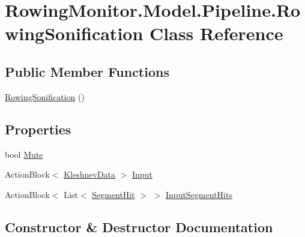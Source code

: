 \hypertarget{class_rowing_monitor_1_1_model_1_1_pipeline_1_1_rowing_sonification}{}\section{Rowing\+Monitor.\+Model.\+Pipeline.\+Rowing\+Sonification Class Reference}
\label{class_rowing_monitor_1_1_model_1_1_pipeline_1_1_rowing_sonification}
\subsection*{Public Member Functions}
\begin{DoxyCompactItemize}
\item 
\hyperlink{class_rowing_monitor_1_1_model_1_1_pipeline_1_1_rowing_sonification_aa3189ffe2f7c36a9cc5afaad8c7d896d}{Rowing\+Sonification} ()
\end{DoxyCompactItemize}
\subsection*{Properties}
\begin{DoxyCompactItemize}
\item 
bool \hyperlink{class_rowing_monitor_1_1_model_1_1_pipeline_1_1_rowing_sonification_af076633c8ac6e8f30336b0ca0bb891e0}{Mute}
\item 
Action\+Block$<$ \hyperlink{struct_rowing_monitor_1_1_model_1_1_pipeline_1_1_kleshnev_data}{Kleshnev\+Data} $>$ \hyperlink{class_rowing_monitor_1_1_model_1_1_pipeline_1_1_rowing_sonification_aa36c7f6801b612cb4363e2c0338e6e70}{Input}
\item 
Action\+Block$<$ List$<$ \hyperlink{struct_rowing_monitor_1_1_model_1_1_util_1_1_segment_hit}{Segment\+Hit} $>$ $>$ \hyperlink{class_rowing_monitor_1_1_model_1_1_pipeline_1_1_rowing_sonification_a52fbdd66e6e0d5a8a936df0a193ab59a}{Input\+Segment\+Hits}
\end{DoxyCompactItemize}


\subsection{Constructor \& Destructor Documentation}
\mbox{\label{class_rowing_monitor_1_1_model_1_1_pipeline_1_1_rowing_sonification_aa3189ffe2f7c36a9cc5afaad8c7d896d}} 
